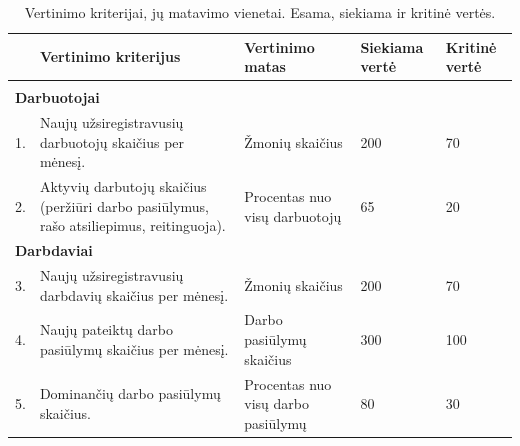 \documentclass{VUMIFPSkursinis}
\begin{document}
\begin{table}[H]
\caption{Vertinimo kriterijai, jų matavimo vienetai. Esama, siekiama ir kritinė vertės.}
\centering
\normalsize
\begin{tabular}{|p{0.6cm}|p{6cm}|p{3cm}|p{1.6cm}|p{1.5cm}|}
\hline
\rowcolor{gray!40}

\multicolumn{1}{|m{0.6cm}|}{\textbf{NR.}}&\multicolumn{1}{m{6cm}|}{\textbf{Vertinimo kriterijus}}&\multicolumn{1}{m{3cm}|}{\textbf{Vertinimo matas}}&\multicolumn{1}{m{1.6cm}|}{\textbf{Siekiama vertė}}&\multicolumn{1}{m{1.5cm}|}{\textbf{Kritinė vertė}}\\ \hline

\rowcolor{gray!10}
\multicolumn{5}{|l|}{\textbf{ĮEIGA}} \\ \hline

\multicolumn{5}{|l|}{\textbf{Darbuotojai}} \\ \hline

\multicolumn{1}{|m{0.6cm}|}{1.}&\multicolumn{1}{m{6cm}|}{Naujų užsiregistravusių darbuotojų skaičius per mėnesį.}&\multicolumn{1}{m{3cm}|}{Žmonių skaičius}&\multicolumn{1}{m{1.6cm}|}{200}&\multicolumn{1}{m{1.5cm}|}{70}\\ \hline

\multicolumn{1}{|m{0.6cm}|}{2.}&\multicolumn{1}{m{6cm}|}{Aktyvių darbutojų skaičius (peržiūri darbo pasiūlymus, rašo atsiliepimus, reitinguoja).}&\multicolumn{1}{m{3cm}|}{Procentas nuo visų darbuotojų}&\multicolumn{1}{m{1.6cm}|}{65}&\multicolumn{1}{m{1.5cm}|}{20}\\ \hline

\multicolumn{5}{|l|}{\textbf{Darbdaviai}} \\ \hline

\multicolumn{1}{|m{0.6cm}|}{3.}&\multicolumn{1}{m{6cm}|}{Naujų užsiregistravusių darbdavių skaičius per mėnesį.}&\multicolumn{1}{m{3cm}|}{Žmonių skaičius}&\multicolumn{1}{m{1.6cm}|}{200}&\multicolumn{1}{m{1.5cm}|}{70}\\ \hline

\multicolumn{1}{|m{0.6cm}|}{4.}&\multicolumn{1}{m{6cm}|}{Naujų pateiktų darbo pasiūlymų skaičius per mėnesį.}&\multicolumn{1}{m{3cm}|}{Darbo pasiūlymų skaičius}&\multicolumn{1}{m{1.6cm}|}{300}&\multicolumn{1}{m{1.5cm}|}{100}\\ \hline

\multicolumn{1}{|m{0.6cm}|}{5.}&\multicolumn{1}{m{6cm}|}{Dominančių darbo pasiūlymų skaičius.}&\multicolumn{1}{m{3cm}|}{Procentas nuo visų darbo pasiūlymų}&\multicolumn{1}{m{1.6cm}|}{80}&\multicolumn{1}{m{1.5cm}|}{30}\\ \hline


\end{tabular}
\end{table}
\end{document}
